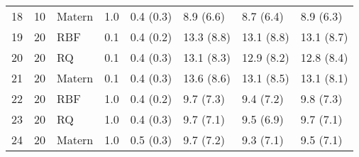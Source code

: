 \begin{tabular}{lrlrllll}
  \textsc{18} & 10 & Matern & 1.0 & 0.4 (0.3) & 8.9 (6.6) & 8.7 (6.4) & 8.9 (6.3) \\ 
  \textsc{19} & 20 & RBF & 0.1 & 0.4 (0.2) & 13.3 (8.8) & 13.1 (8.8) & 13.1 (8.7) \\ 
  \textsc{20} & 20 & RQ & 0.1 & 0.4 (0.3) & 13.1 (8.3) & 12.9 (8.2) & 12.8 (8.4) \\ 
  \textsc{21} & 20 & Matern & 0.1 & 0.4 (0.3) & 13.6 (8.6) & 13.1 (8.5) & 13.1 (8.1) \\ 
  \textsc{22} & 20 & RBF & 1.0 & 0.4 (0.2) & 9.7 (7.3) & 9.4 (7.2) & 9.8 (7.3) \\ 
  \textsc{23} & 20 & RQ & 1.0 & 0.4 (0.3) & 9.7 (7.1) & 9.5 (6.9) & 9.7 (7.1) \\ 
  \textsc{24} & 20 & Matern & 1.0 & 0.5 (0.3) & 9.7 (7.2) & 9.3 (7.1) & 9.5 (7.1) \\ 
   \bottomrule
\end{tabular}
